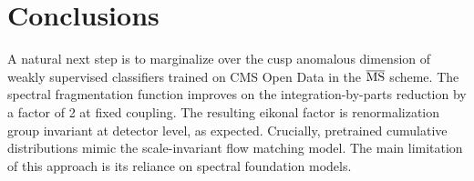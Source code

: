\section{Conclusions}\label{sec:conclusions}

A natural next step is to marginalize over the cusp anomalous dimension
of weakly supervised classifiers trained on CMS Open Data in the
$\overline{\rm MS}$ scheme. The spectral fragmentation function improves
on the integration-by-parts reduction by a factor of 2 at fixed
coupling. The resulting eikonal factor is renormalization group
invariant at detector level, as expected. Crucially, pretrained
cumulative distributions mimic the scale-invariant flow matching model.
The main limitation of this approach is its reliance on spectral
foundation models.

